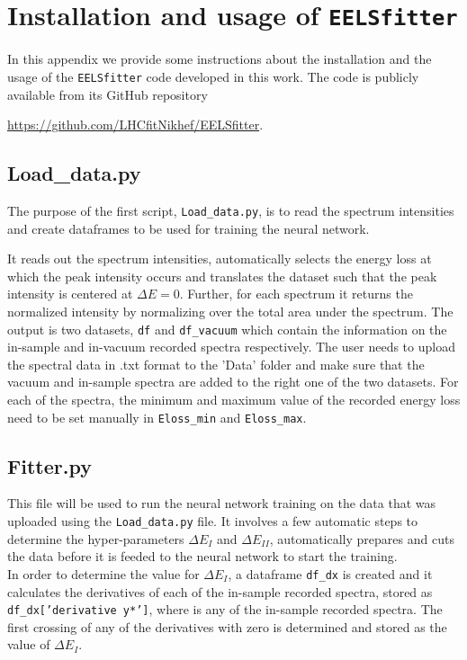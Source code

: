 
\section{Installation and usage of {\tt EELSfitter}}
\label{sec:installation}

In this appendix we provide some instructions about the installation
and the usage of the {\tt EELSfitter} code developed
in this work.
%
The code is publicly available from its GitHub repository
\begin{center}
\url{https://github.com/LHCfitNikhef/EELSfitter}.
\end{center}

\subsection*{Load\_data.py}
The purpose of the first script, {\tt Load\_data.py}, is to read the spectrum
intensities and create dataframes to be used for training the neural network.
%

It reads out the spectrum intensities, automatically selects the energy loss
at which the peak intensity occurs and translates the dataset such that
the peak intensity is centered at $\Delta E =$0. 
%
Further, for each spectrum it returns the normalized intensity by normalizing
over the total area under the spectrum. 
%
The output is two datasets, {\tt df} and {\tt df\_vacuum} which contain the 
information on the in-sample and in-vacuum recorded spectra respectively. 
%
The user needs to upload the spectral data in .txt format to the 'Data' folder
and make sure that the vacuum and in-sample spectra are added to the right one
of the two datasets. 
%
For each of the spectra, the minimum and maximum value of the recorded energy 
loss need to be set manually in {\tt Eloss\_min} and {\tt Eloss\_max}.

\subsection*{Fitter.py}
This file will be used to run the neural network training on the data that was 
uploaded using the {\tt Load\_data.py} file.
%
It involves a few automatic steps to determine the hyper-parameters $\Delta E_I$
and $\Delta E_{II}$, automatically prepares and cuts the data before it is feeded
to the neural network to start the training. 
%
\\

In order to determine the value for $\Delta E_I$, a dataframe {\tt df\_dx} is created
and it calculates the derivatives of each of the in-sample recorded spectra, 
stored as {\tt df\_dx['derivative y*']}, where {\tt *} is any of the in-sample recorded spectra.
%
The first crossing of any of the derivatives with zero is determined 
and stored as the value of $\Delta E_I$. 
%
\\

